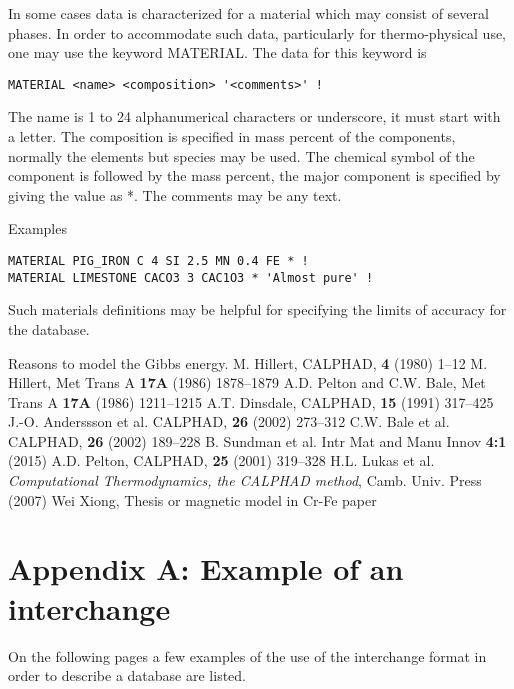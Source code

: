 \documentclass[12pt]{article}
\begin{document}
In some cases data is characterized for a material which may consist
of several phases.  In order to accommodate such data, particularly for
thermo-physical use, one may use the keyword MATERIAL.  The data for this
keyword is

\begin{verbatim}
MATERIAL <name> <composition> '<comments>' !
\end{verbatim}

The name is 1 to 24 alphanumerical characters or underscore, it must
start with a letter.  The composition is specified in mass percent of
the components, normally the elements but species may be used.  The
chemical symbol of the component is followed by the mass percent, the
major component is specified by giving the value as *.  The comments
may be any text.  

Examples

\begin{verbatim}
MATERIAL PIG_IRON C 4 SI 2.5 MN 0.4 FE * !
MATERIAL LIMESTONE CACO3 3 CAC1O3 * 'Almost pure' !
\end{verbatim}

Such materials definitions may be helpful for specifying the limits of
accuracy for the database.

\begin{thebibliography}{00Zzz}
 Reasons to model the Gibbs energy.
 M. Hillert, CALPHAD, {\bf 4} (1980) 1--12
 M. Hillert, Met Trans A {\bf 17A} (1986) 1878--1879
 A.D. Pelton and C.W. Bale, Met Trans A {\bf 17A}
  (1986) 1211--1215
 A.T. Dinsdale, CALPHAD, {\bf 15} (1991) 317--425 
 J.-O. Anderssson et al. CALPHAD, {\bf 26} (2002) 273--312
 C.W. Bale et al. CALPHAD, {\bf 26} (2002) 189--228
 B. Sundman et al. Intr Mat and Manu Innov {\bf 4:1} (2015)
 A.D. Pelton, CALPHAD, {\bf 25} (2001) 319--328
 H.L. Lukas et al. {\em Computational Thermodynamics,
  the CALPHAD method}, Camb. Univ. Press (2007)
 Wei Xiong, Thesis or magnetic model in Cr-Fe paper 
\end{thebibliography}

\newpage

\section{Appendix A: Example of an interchange}

On the following pages a few examples of the use of the interchange
format in order to describe a database are listed.
\end{document}

